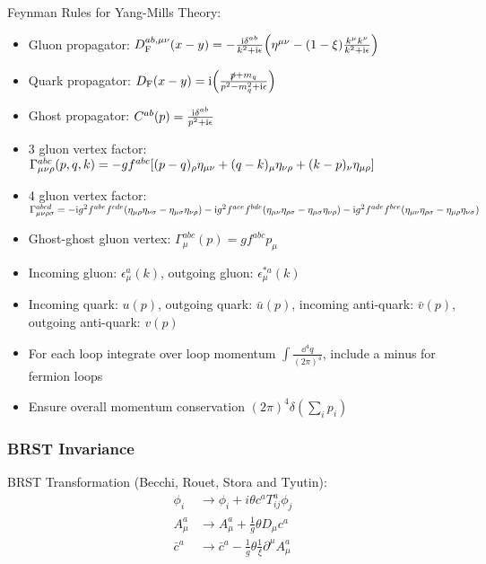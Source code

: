 		\noindent
		Feynman Rules for Yang-Mills Theory:
		\begin{itemize}\itemsep -0pt
			\item Gluon propagator: $D_\text{F}^{ab,\mu\nu}(x-y) = -\frac{\mathrm{i} \delta^{ab}}{k^2+\mathrm{i}\epsilon} \qty(\eta^{\mu\nu}-(1-\xi)\frac{k^\mu k^\nu}{k^2+\mathrm{i}\epsilon} )$
			\item Quark propagator: $D_\text{F}(x-y) = \mathrm{i}\qty(\frac{\slashed{p}+m_q}{p^2-m_q^2+\mathrm{i}\epsilon})$
			\item Ghost propagator: $C^{ab}(p) = \frac{\mathrm{i}\delta^{ab}}{p^2+\mathrm{i}\epsilon}$
			\item 3 gluon vertex factor: $\Gamma^{abc}_{\mu\nu\rho}(p,q,k) = -gf^{abc} \qty[(p-q)_\rho \eta_{\mu\nu} + (q-k)_\mu \eta_{\nu\rho} + (k-p)_\nu \eta_{\mu\rho}]$
			\item 4 gluon vertex factor: $\Gamma^{abcd}_{\mu\nu\rho\sigma} = -\mathrm{i} g^2 f^{abe}f^{cde}(\eta_{\mu\rho}\eta_{\nu\sigma} - \eta_{\mu\sigma}\eta_{\nu\rho}) - \mathrm{i} g^2 f^{ace}f^{bde} (\eta_{\mu\nu}\eta_{\rho\sigma} - \eta_{\mu\sigma}\eta_{\nu\rho}) - \mathrm{i} g^2 f^{ade} f^{bce} (\eta_{\mu\nu}\eta_{\rho\sigma} - \eta_{\mu\rho}\eta_{\nu\sigma})$
			\item Ghost-ghost gluon vertex: $\Gamma^{abc}_\mu(p) = gf^{abc} p_\mu$
			\item Incoming gluon: $\epsilon^a_\mu(k)$, outgoing gluon: $\epsilon^{*a}_\mu(k)$
			\item Incoming quark: $u(p)$, outgoing quark: $\bar{u}(p)$, incoming anti-quark: $\bar{v}(p)$, outgoing anti-quark: $v(p)$
			\item For each loop integrate over loop momentum $\int \frac{\dd^4 q}{(2\pi)^4}$, include a minus for fermion loops
			\item Ensure overall momentum conservation $(2\pi)^4 \delta(\sum_i p_i)$
		\end{itemize}
		
		\subsubsection{BRST Invariance}
			BRST Transformation (Becchi, Rouet, Stora and Tyutin):
			\begin{equation}
				\begin{aligned}
					\phi_i &\rightarrow \phi_i + i\theta c^a T^a_{ij} \phi_j \\
					A^a_\mu &\rightarrow A^a_\mu + \frac{1}{g}\theta D_\mu c^a \\
					\bar{c}^a &\rightarrow \bar{c}^a - \frac{1}{g} \theta \frac{1}{\xi} \partial^\mu A^a_\mu \\
				\end{aligned}
			\end{equation}
	
